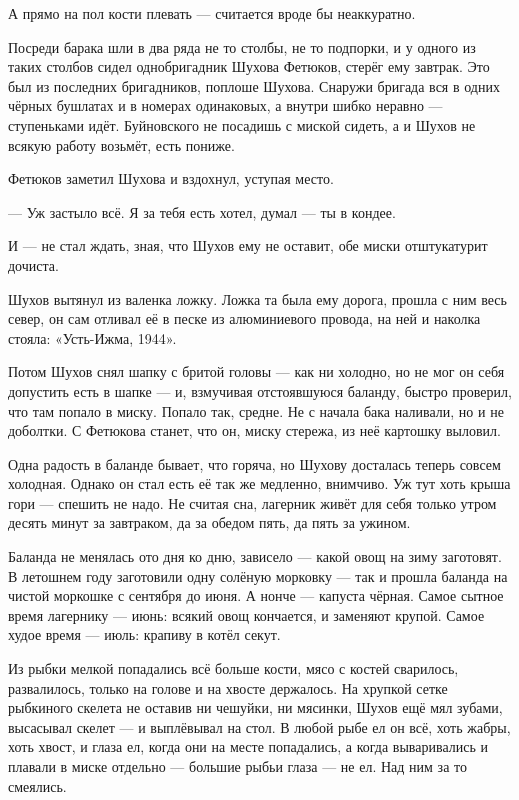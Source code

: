А прямо на пол кости плевать --- считается вроде бы неаккуратно.

Посреди барака шли в два ряда не то столбы, не то подпорки, и у одного из таких столбов сидел однобригадник Шухова Фетюков, стерёг ему завтрак. Это был из последних бригадников, поплоше Шухова. Снаружи бригада вся в одних чёрных бушлатах и в номерах одинаковых, а внутри шибко неравно --- ступеньками идёт. Буйновского не посадишь с миской сидеть, а и Шухов не всякую работу возьмёт, есть пониже.

Фетюков заметил Шухова и вздохнул, уступая место.

--- Уж застыло всё. Я за тебя есть хотел, думал --- ты в кондее.

И --- не стал ждать, зная, что Шухов ему не оставит, обе миски отштукатурит дочиста.

Шухов вытянул из валенка ложку. Ложка та была ему дорога, прошла с ним весь север, он сам отливал её в песке из алюминиевого провода, на ней и наколка стояла: «Усть-Ижма, 1944».

Потом Шухов снял шапку с бритой головы --- как ни холодно, но не мог он себя допустить есть в шапке --- и, взмучивая отстоявшуюся баланду, быстро проверил, что там попало в миску. Попало так, средне. Не с начала бака наливали, но и не доболтки. С Фетюкова станет, что он, миску стережа, из неё картошку выловил.

Одна радость в баланде бывает, что горяча, но Шухову досталась теперь совсем холодная. Однако он стал есть её так же медленно, внимчиво. Уж тут хоть крыша гори --- спешить не надо. Не считая сна, лагерник живёт для себя только утром десять минут за завтраком, да за обедом пять, да пять за ужином.

Баланда не менялась ото дня ко дню, зависело --- какой овощ на зиму заготовят. В летошнем году заготовили одну солёную морковку --- так и прошла баланда на чистой моркошке с сентября до июня. А нонче --- капуста чёрная. Самое сытное время лагернику --- июнь: всякий овощ кончается, и заменяют крупой. Самое худое время --- июль: крапиву в котёл секут.

Из рыбки мелкой попадались всё больше кости, мясо с костей сварилось, развалилось, только на голове и на хвосте держалось. На хрупкой сетке рыбкиного скелета не оставив ни чешуйки, ни мясинки, Шухов ещё мял зубами, высасывал скелет --- и выплёвывал на стол. В любой рыбе ел он всё, хоть жабры, хоть хвост, и глаза ел, когда они на месте попадались, а когда вываривались и плавали в миске отдельно --- большие рыбьи глаза --- не ел. Над ним за то смеялись.

